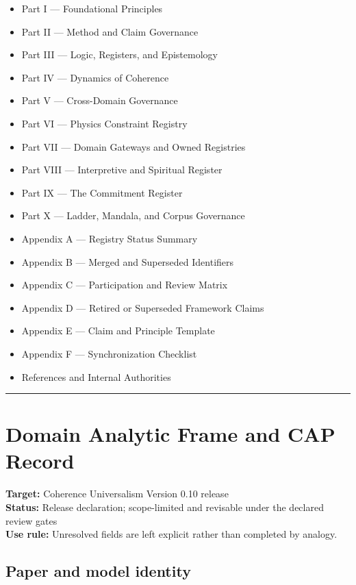\documentclass[
  11pt,
]{article}
\providecommand{\tightlist}{%
  \setlength{\itemsep}{0pt}\setlength{\parskip}{0pt}}
\begin{document}
\begin{itemize}
\tightlist
\item
  Part I --- Foundational Principles
\item
  Part II --- Method and Claim Governance
\item
  Part III --- Logic, Registers, and Epistemology
\item
  Part IV --- Dynamics of Coherence
\item
  Part V --- Cross-Domain Governance
\item
  Part VI --- Physics Constraint Registry
\item
  Part VII --- Domain Gateways and Owned Registries
\item
  Part VIII --- Interpretive and Spiritual Register
\item
  Part IX --- The Commitment Register
\item
  Part X --- Ladder, Mandala, and Corpus Governance
\item
  Appendix A --- Registry Status Summary
\item
  Appendix B --- Merged and Superseded Identifiers
\item
  Appendix C --- Participation and Review Matrix
\item
  Appendix D --- Retired or Superseded Framework Claims
\item
  Appendix E --- Claim and Principle Template
\item
  Appendix F --- Synchronization Checklist
\item
  References and Internal Authorities
\end{itemize}

\begin{center}\rule{0.5\linewidth}{0.5pt}\end{center}

\section{Domain Analytic Frame and CAP
Record}\label{domain-analytic-frame-and-cap-record}

\textbf{Target:} Coherence Universalism Version 0.10 release\\
\textbf{Status:} Release declaration; scope-limited and revisable under
the declared review gates\\
\textbf{Use rule:} Unresolved fields are left explicit rather than
completed by analogy.

\subsection{Paper and model identity}\label{paper-and-model-identity}
\end{document}

